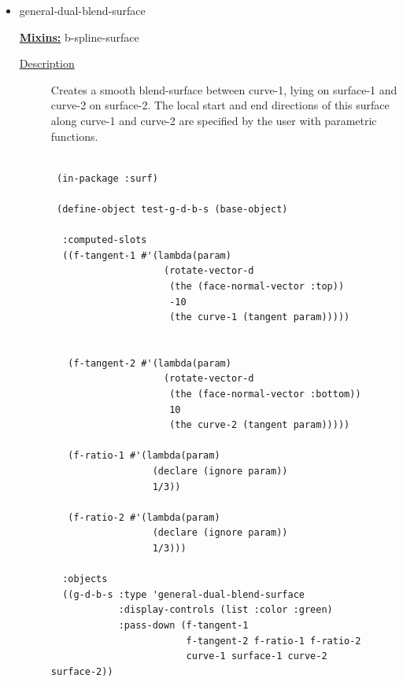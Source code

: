 \documentclass [11pt]{book}
\begin{document}
\begin{itemize}
\begin{description}
\end{description}







\item {}general-dual-blend-surface


\textbf{
\underline{Mixins:}} b-spline-surface





\begin{description}

\item [
\underline{Description}]


Creates a smooth blend-surface between curve-1, lying on surface-1 and curve-2 on surface-2. The local start and end directions of this surface along curve-1 and curve-2 are specified by the user with parametric functions.



\end{description}




\begin{figure}
\begin{lrbox}{\boxedverb}
\begin{minipage}{\linewidth}
{\small

\begin{verbatim}

 (in-package :surf)

 (define-object test-g-d-b-s (base-object)
  
  :computed-slots
  ((f-tangent-1 #'(lambda(param)
                    (rotate-vector-d 
                     (the (face-normal-vector :top))
                     -10
                     (the curve-1 (tangent param)))))
                    
   
   (f-tangent-2 #'(lambda(param)
                    (rotate-vector-d 
                     (the (face-normal-vector :bottom))
                     10
                     (the curve-2 (tangent param)))))
   
   (f-ratio-1 #'(lambda(param)
                  (declare (ignore param))
                  1/3))
   
   (f-ratio-2 #'(lambda(param)
                  (declare (ignore param))
                  1/3)))
   
  :objects
  ((g-d-b-s :type 'general-dual-blend-surface
            :display-controls (list :color :green)
            :pass-down (f-tangent-1 
                        f-tangent-2 f-ratio-1 f-ratio-2
                        curve-1 surface-1 curve-2 surface-2))
                                    

\end{verbatim}}
\end{minipage}
\end{lrbox}
\end{figure}
\end{itemize}
\end{document}
